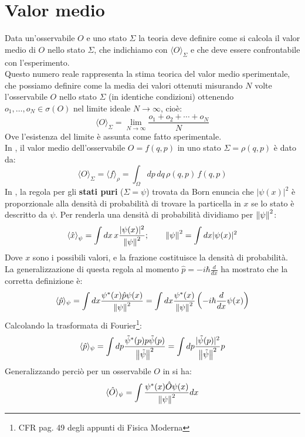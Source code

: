 \documentclass[FisicaTeorica.tex]{subfiles}
\begin{document}
\section{Valor medio}
Data un'osservabile $O$ e uno stato $\Sigma$ la teoria deve definire come si calcola il valor medio di $O$ nello stato $\Sigma$, che indichiamo con $\langle O \rangle_\Sigma$ e che deve essere confrontabile con l'esperimento.\\
Questo numero reale rappresenta la stima teorica del valor medio sperimentale, che possiamo definire come la media dei valori ottenuti misurando $N$ volte l'osservabile $O$ nello stato $\Sigma$ (in identiche condizioni) ottenendo $o_1,\dots, o_N\in\sigma(O)$ nel limite ideale $N\to\infty$, cioè:
\begin{equation}
\langle O \rangle_\Sigma =
\lim_{N\to\infty} \frac{o_1+o_2+\cdots +o_N}{N}
\label{eqn:valormediodef}
\end{equation}
Ove l'esistenza del limite è assunta come fatto sperimentale.\\
In \textbf{\MC}, il valor medio dell'osservabile $O = f(q,p)$ in uno stato $\Sigma = \rho(q,p)$ è dato da:
\begin{equation}
\langle O \rangle_\Sigma = \langle f\rangle_\rho = \int_\Omega dp\,dq\, \rho(q,p)\,f(q,p)
\label{eqn:valor-medio-classico}
\end{equation}
In \textbf{\MQ}, la regola per gli \textbf{stati puri} ($\Sigma = \psi$) trovata da Born enuncia che $|\psi(x)|^2$ è proporzionale alla densità di probabilità di trovare la particella in $x$ se lo stato è descritto da $\psi$. Per renderla una densità di probabilità dividiamo per $\left\lVert\psi\right\rVert^2$:
\[
\left\langle{\hat{x}}\right\rangle_\psi = \int dx \,x \frac{|\psi(x)|^2}{\left\lVert\psi\right\rVert^2}; \quad \quad \left\lVert\psi\right\rVert^2 = \int dx |\psi(x)|^2 
\]
Dove $x$ sono i possibili valori, e la frazione costituisce la densità di probabilità.\\
La generalizzazione di questa regola al momento $\hat{p}=-i\hbar \frac{d}{dx}$ ha mostrato che la corretta definizione è:
\[
\langle \hat{p} \rangle_\psi = \int dx \frac{\psi^*(x) \hat{p}\psi(x)}{\left\lVert\psi\right\rVert^2} = \int dx \frac{\psi^*(x)}{\left\lVert\psi\right\rVert^2} \left ( -i\hbar \frac{d}{dx}\psi(x) \right )
\]
Calcolando la trasformata di Fourier\footnote{CFR pag. 49 degli appunti di Fisica Moderna}: %
\[
\langle \hat{p} \rangle_\psi = \int dp \frac{\tilde{\psi}^*(p)p\tilde{\psi}(p)}{\left\lVert\tilde{\psi}\right\rVert^2} = \int dp\frac{|\tilde{\psi}(p)|^2}{\left\lVert\tilde{\psi}\right\rVert^2}p
\]
Generalizzando perciò per un osservabile $O$ in \textbf{\MQ} si ha:
\begin{equation}
\langle \hat{O}\rangle_\psi = \int \frac{\psi^*(x) \hat{O} \psi(x)}{\left\lVert\psi\right\rVert^2} dx
\label{eqn:valor-medio-MQ}
\end{equation}
\end{document}
